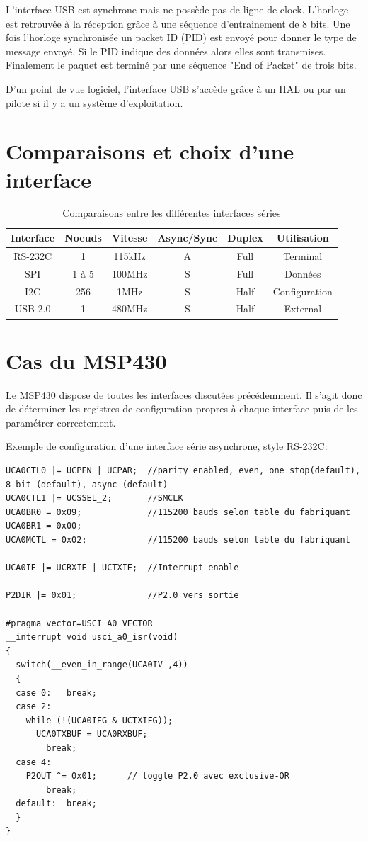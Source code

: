 L'interface USB est synchrone mais ne possède pas de ligne de clock. L'horloge est retrouvée à la réception grâce à une séquence d'entrainement de 8 bits. Une fois l'horloge synchronisée un packet ID (PID) est envoyé pour donner le type de message envoyé. Si le PID indique des données alors elles sont transmises. Finalement le paquet est terminé par une séquence "End of Packet" de trois bits.

D'un point de vue logiciel, l'interface USB s'accède grâce à un HAL ou par un pilote si il y a un système d'exploitation.

\section{Comparaisons et choix d'une interface}

\begin{table}[!htbp]
\begin{center}
{\selectfont
\begin{tabular}{|c|c|c|c|c|c|}
\hline 
Interface & Noeuds & Vitesse & Async/Sync & Duplex & Utilisation\\
\hline  
\hline 
RS-232C & 1 & 115kHz & A & Full & Terminal\\
\hline 
SPI & 1 à 5 & 100MHz & S & Full & Données\\
\hline
I2C & 256 & 1MHz & S & Half & Configuration\\
\hline
USB 2.0 & 1 & 480MHz & S & Half & External\\
\hline
\end{tabular}
}
\end{center}
\caption{Comparaisons entre les différentes interfaces séries \label{serial}}
\end{table}

\section{Cas du MSP430}

Le MSP430 dispose de toutes les interfaces discutées précédemment. Il s'agit donc de déterminer les registres de configuration propres à chaque interface puis de les paramétrer correctement.

Exemple de configuration d'une interface série asynchrone, style RS-232C:

\lstset{style=customc}
\begin{lstlisting}
UCA0CTL0 |= UCPEN | UCPAR;	//parity enabled, even, one stop(default), 8-bit (default), async (default)
UCA0CTL1 |= UCSSEL_2;		//SMCLK
UCA0BR0 = 0x09;				//115200 bauds selon table du fabriquant
UCA0BR1 = 0x00;
UCA0MCTL = 0x02;			//115200 bauds selon table du fabriquant		
 
UCA0IE |= UCRXIE | UCTXIE;	//Interrupt enable
	
P2DIR |= 0x01;				//P2.0 vers sortie 	 
 
#pragma vector=USCI_A0_VECTOR
__interrupt void usci_a0_isr(void)
{
  switch(__even_in_range(UCA0IV ,4))
  {
  case 0: 	break;
  case 2:
   	while (!(UCA0IFG & UCTXIFG));
	  UCA0TXBUF = UCA0RXBUF;
		break;
  case 4:
   	P2OUT ^= 0x01;		// toggle P2.0 avec exclusive-OR 
		break;
  default: 	break;
  }
}
\end{lstlisting}

